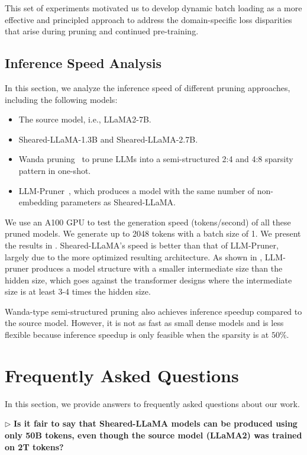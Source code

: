 This set of experiments motivated us to develop dynamic batch loading as a more effective and principled approach to address the domain-specific loss disparities that arise during pruning and continued pre-training.


\subsection{Inference Speed Analysis}
\label{app:inference_speed}
In this section, we analyze the inference speed of different pruning approaches, including the following models:
\begin{itemize}
\item The source model, i.e., LLaMA2-7B.
\item Sheared-LLaMA-1.3B and Sheared-LLaMA-2.7B.
\item Wanda pruning~\citep{sun2023simple} to prune LLMs into a semi-structured 2:4 and 4:8 sparsity pattern in one-shot.
\item LLM-Pruner~\citep{ma2023llm}, which produces a model with the same number of non-embedding parameters as Sheared-LLaMA.
\end{itemize}

We use an A100 GPU to test the generation speed (tokens/second) of all these pruned models. We generate up to 2048 tokens with a batch size of 1. We present the results in . Sheared-LLaMA's speed is better than that of LLM-Pruner, largely due to the more optimized resulting architecture. As shown in , LLM-pruner produces a model structure with a smaller intermediate size than the hidden size, which goes against the transformer designs where the intermediate size is at least 3-4 times the hidden size.

Wanda-type semi-structured pruning also achieves inference speedup compared to the source model. However, it is not as fast as small dense models and is less flexible because inference speedup is only feasible when the sparsity is at $50\%$.



\section{Frequently Asked Questions}
\label{app:faq}

In this section, we provide answers to frequently asked questions about our work.

$\triangleright$ \textbf{Is it fair to say that Sheared-LLaMA models can be produced using only 50B tokens, even though the source model (LLaMA2) was trained on 2T tokens?}

